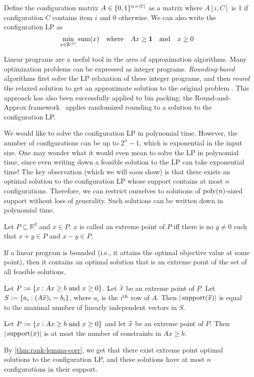 Define the configuration matrix $A \in \{0, 1\}^{n \times |\mathcal{C}|}$
as a matrix where $A[i, C]$ is 1 if configuration $C$ contains item $i$ and 0 otherwise.
We can also write the configuration LP as
\[ \min_{x \in \mathbb{R}^{|\mathcal{C}|}} \operatorname{sum}(x)
\quad\textrm{where}\quad Ax \ge \mathbf{1} \quad\textrm{and}\quad x \ge 0 \]

Linear programs are a useful tool in the area of approximation algorithms.
Many optimization problems can be expressed as integer programs.
\emph{Rounding-based} algorithms first solve the LP relaxation of these integer programs,
and then \emph{round} the relaxed solution to get an approximate solution to the original problem
\cite{daa:det-lp-round,daa:rand-lp-round,iterative-methods}.
This approach has also been successfully applied to bin packing:
the Round-and-Approx framework~\cite{rna,bansal2014binpacking}
applies randomized rounding to a solution to the configuration LP.

We would like to solve the configuration LP in polynomial time.
However, the number of configurations can be up to $2^n-1$,
which is exponential in the input size.
One may wonder what it would even mean to solve the LP in polynomial time,
since even writing down a feasible solution to the LP can take exponential time!
The key observation (which we will soon show) is that
there exists an optimal solution to the configuration LP
whose support contains at most $n$ configurations.
Therefore, we can restrict ourselves to solutions of $\operatorname{poly}(n)$-sized support
without loss of generality. Such solutions can be written down in polynomial time.

\begin{definition}
Let $P \subseteq \mathbb{R}^d$ and $x \in P$.
$x$ is called an extreme point of $P$ iff there is no $y \neq 0$
such that $x + y \in P$ and $x - y \in P$.
\end{definition}
\begin{lemma}
If a linear program is bounded (i.e., it attains the optimal objective value at some point),
then it contains an optimal solution that is an extreme point of the set of all feasible solutions.
\end{lemma}
\begin{lemma}
Let $P := \{x: Ax \ge b \textrm{ and } x \ge 0\}$. Let $\widehat{x}$ be an extreme point of $P$.
Let $S := \{a_i: (A\widehat{x})_i = b_i\}$, where $a_i$ is the $i^{\textrm{th}}$ row of $A$.
Then $|\operatorname{support}(\widehat{x})|$ is equal to the maximal number of linearly independent vectors in $S$.
\end{lemma}
\begin{corollary}
\label{thm:rank-lemma-corr}
Let $P := \{x: Ax \ge b \textrm{ and } x \ge 0\}$ and let $\widehat{x}$ be an extreme point of $P$.
Then $|\operatorname{support}(x)|$ is at most the number of constraints in $Ax \ge b$.
\end{corollary}
By \cref{thm:rank-lemma-corr}, we get that there exist extreme point optimal solutions
to the configuration LP, and these solutions have at most $n$ configurations in their support.

